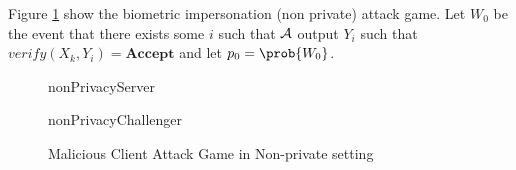 \begin{description}
\begin{description}
    Figure \ref{fig:maliciousNonPrivate} show the biometric
    impersonation (non private) attack game. Let $W_{0}$ be the event that there exists some $i$ such that
    $\mathcal{A}$ output $Y_{i}$ such that
    $verify(X_{k},Y_{i}) = \mathbf{Accept}$ and let $p_{0} = \prob{W_{0}} $.
    \begin{figure}[!h]
      \begin{center}
        \begin{bbrenv}{nonPrivacyServer}
          \begin{bbrbox}[name=Adversary, minheight=2cm]
          \end{bbrbox}
          \begin{bbrchallenger}{nonPrivacyChallenger}
            \begin{bbrbox}[name=Challenger]
            \end{bbrbox}
          \end{bbrchallenger}
        \end{bbrenv}
      \end{center}
      \caption{Malicious Client Attack Game in Non-private setting}
      \label{fig:maliciousNonPrivate}
    \end{figure}

    


\end{description}
\end{description}
